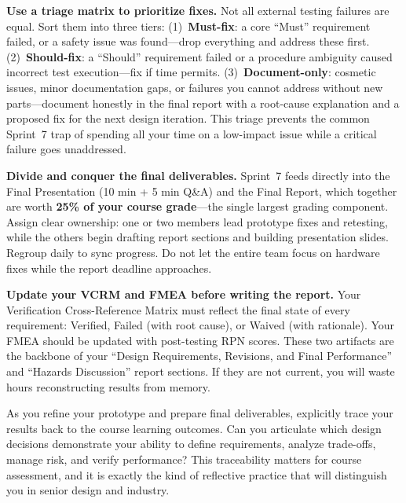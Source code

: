 \begin{protip}
\textbf{Use a triage matrix to prioritize fixes.} Not all external testing failures are equal. Sort them into three tiers: (1)~\textbf{Must-fix}: a core ``Must'' requirement failed, or a safety issue was found---drop everything and address these first. (2)~\textbf{Should-fix}: a ``Should'' requirement failed or a procedure ambiguity caused incorrect test execution---fix if time permits. (3)~\textbf{Document-only}: cosmetic issues, minor documentation gaps, or failures you cannot address without new parts---document honestly in the final report with a root-cause explanation and a proposed fix for the next design iteration. This triage prevents the common Sprint~7 trap of spending all your time on a low-impact issue while a critical failure goes unaddressed.
\end{protip}

\begin{tipbox}
\textbf{Divide and conquer the final deliverables.} Sprint~7 feeds directly into the Final Presentation (10 min + 5 min Q\&A) and the Final Report, which together are worth \textbf{25\% of your course grade}---the single largest grading component. Assign clear ownership: one or two members lead prototype fixes and retesting, while the others begin drafting report sections and building presentation slides. Regroup daily to sync progress. Do not let the entire team focus on hardware fixes while the report deadline approaches.
\end{tipbox}

\begin{warnbox}
\textbf{Update your VCRM and FMEA before writing the report.} Your Verification Cross-Reference Matrix must reflect the final state of every requirement: Verified, Failed (with root cause), or Waived (with rationale). Your FMEA should be updated with post-testing RPN scores. These two artifacts are the backbone of your ``Design Requirements, Revisions, and Final Performance'' and ``Hazards Discussion'' report sections. If they are not current, you will waste hours reconstructing results from memory.
\end{warnbox}

\begin{protip}
As you refine your prototype and prepare final deliverables, explicitly trace your results back to the course learning outcomes. Can you articulate which design decisions demonstrate your ability to define requirements, analyze trade-offs, manage risk, and verify performance? This traceability matters for course assessment, and it is exactly the kind of reflective practice that will distinguish you in senior design and industry.
\end{protip}

